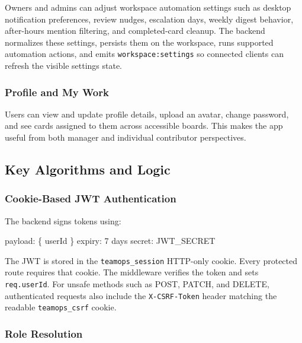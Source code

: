 \documentclass[
]{article}
\newenvironment{Shaded}{}{}
\newcommand{\NormalTok}[1]{#1}
\begin{document}
Owners and admins can adjust workspace automation settings such as
desktop notification preferences, review nudges, escalation days, weekly
digest behavior, after-hours mention filtering, and completed-card
cleanup. The backend normalizes these settings, persists them on the
workspace, runs supported automation actions, and emits
\texttt{workspace:settings} so connected clients can refresh the visible
settings state.

\subsubsection{Profile and My Work}\label{profile-and-my-work}

Users can view and update profile details, upload an avatar, change
password, and see cards assigned to them across accessible boards. This
makes the app useful from both manager and individual contributor
perspectives.

\subsection{Key Algorithms and Logic}\label{key-algorithms-and-logic}

\subsubsection{Cookie-Based JWT
Authentication}\label{cookie-based-jwt-authentication}

The backend signs tokens using:

\begin{Shaded}
\begin{Highlighting}[]
\NormalTok{payload: \{ userId \}}
\NormalTok{expiry: 7 days}
\NormalTok{secret: JWT\_SECRET}
\end{Highlighting}
\end{Shaded}

The JWT is stored in the \texttt{teamops\_session} HTTP-only cookie.
Every protected route requires that cookie. The middleware verifies the
token and sets \texttt{req.userId}. For unsafe methods such as POST,
PATCH, and DELETE, authenticated requests also include the
\texttt{X-CSRF-Token} header matching the readable
\texttt{teamops\_csrf} cookie.

\subsubsection{Role Resolution}\label{role-resolution}
\end{document}
